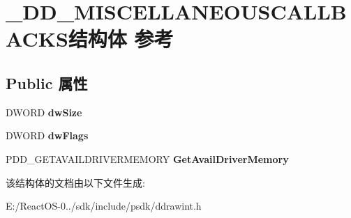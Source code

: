 \hypertarget{struct___d_d___m_i_s_c_e_l_l_a_n_e_o_u_s_c_a_l_l_b_a_c_k_s}{}\section{\+\_\+\+D\+D\+\_\+\+M\+I\+S\+C\+E\+L\+L\+A\+N\+E\+O\+U\+S\+C\+A\+L\+L\+B\+A\+C\+K\+S结构体 参考}
\label{struct___d_d___m_i_s_c_e_l_l_a_n_e_o_u_s_c_a_l_l_b_a_c_k_s}
\subsection*{Public 属性}
\begin{DoxyCompactItemize}
\item 
\mbox{\label{struct___d_d___m_i_s_c_e_l_l_a_n_e_o_u_s_c_a_l_l_b_a_c_k_s_ac8a7dc666af62bb163eca10bd773feb9}} 
D\+W\+O\+RD {\bfseries dw\+Size}
\item 
\mbox{\label{struct___d_d___m_i_s_c_e_l_l_a_n_e_o_u_s_c_a_l_l_b_a_c_k_s_a0cbc698fb99e8df76f7417b6d99ececc}} 
D\+W\+O\+RD {\bfseries dw\+Flags}
\item 
\mbox{\label{struct___d_d___m_i_s_c_e_l_l_a_n_e_o_u_s_c_a_l_l_b_a_c_k_s_a3a773fc93ba125ea7e2ec4d84cedfe9d}} 
P\+D\+D\+\_\+\+G\+E\+T\+A\+V\+A\+I\+L\+D\+R\+I\+V\+E\+R\+M\+E\+M\+O\+RY {\bfseries Get\+Avail\+Driver\+Memory}
\end{DoxyCompactItemize}


该结构体的文档由以下文件生成\+:\begin{DoxyCompactItemize}
\item 
E\+:/\+React\+O\+S-\/0../sdk/include/psdk/ddrawint.\+h\end{DoxyCompactItemize}
